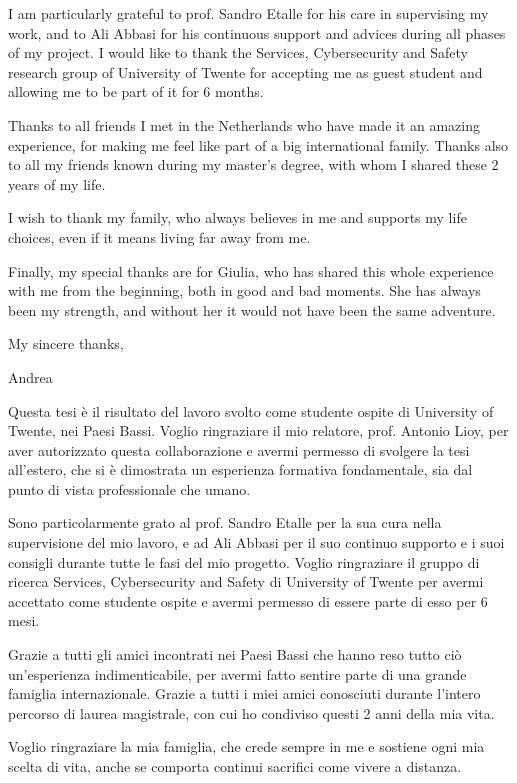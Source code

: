 \documentclass[pdfa,cucitura]{toptesi}
\begin{document}
I am particularly grateful to prof. Sandro Etalle for his care in supervising my work,
and to Ali Abbasi for his continuous support and advices during all phases of my project.
I would like to thank the Services, Cybersecurity and Safety research group of University of Twente for accepting me as guest student
and allowing me to be part of it for 6 months.

Thanks to all friends I met in the Netherlands who have made it an amazing experience, for making me feel like part of a big international family.
Thanks also to all my friends known during my master's degree, with whom I shared these 2 years of my life.

I wish to thank my family, who always believes in me and supports my life choices, even if it means living far away from me.

Finally, my special thanks are for Giulia, who has shared this whole experience with me from the beginning, both in good and bad moments.
She has always been my strength, and without her it would not have been the same adventure.

\hfill My sincere thanks,

\hfill Andrea


\ringraziamenti

Questa tesi \`e il risultato del lavoro svolto come studente ospite di University of Twente, nei Paesi Bassi. Voglio ringraziare il mio relatore, prof. Antonio Lioy,
per aver autorizzato questa collaborazione e avermi permesso di svolgere la tesi all'estero, che si \`e dimostrata un esperienza formativa fondamentale,
sia dal punto di vista professionale che umano.

Sono particolarmente grato al prof. Sandro Etalle per la sua cura nella supervisione del mio lavoro,
e ad Ali Abbasi per il suo continuo supporto e i suoi consigli durante tutte le fasi del mio progetto.
Voglio ringraziare il gruppo di ricerca Services, Cybersecurity and Safety di University of Twente per avermi accettato come studente ospite
e avermi permesso di essere parte di esso per 6 mesi.

Grazie a tutti gli amici incontrati nei Paesi Bassi che hanno reso tutto ciò un'esperienza indimenticabile, per avermi fatto sentire parte di una grande famiglia internazionale.
Grazie a tutti i miei amici conosciuti durante l'intero percorso di laurea magistrale, con cui ho condiviso questi 2 anni della mia vita.

Voglio ringraziare la mia famiglia, che crede sempre in me e sostiene ogni mia scelta di vita, anche se comporta continui sacrifici come vivere a distanza.
\end{document}
